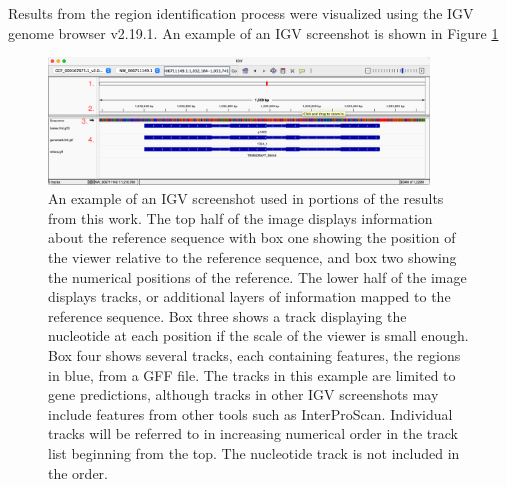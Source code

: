 Results from the region identification process were visualized using
the IGV genome browser v2.19.1\cite{Robinson2011}. An example of an
IGV screenshot is shown in Figure \ref{fig:igv-methods}

\begin{figure}
  \centering
  \includegraphics[width=0.9\textwidth]{figures/igv/igv-agreement-thin-number}
  \caption[IGV example]{An example of an IGV screenshot used in
    portions of the results from this work. The top half of the image
    displays information about the reference sequence with box one
    showing the position of the viewer relative to the reference
    sequence, and box two showing the numerical positions of the
    reference. The lower half of the image displays tracks, or
    additional layers of information mapped to the reference
    sequence. Box three shows a track displaying the nucleotide at
    each position if the scale of the viewer is small enough. Box four
    shows several tracks, each containing features, the regions in
    blue, from a GFF file. The tracks in this example are limited to
    gene predictions, although tracks in other IGV screenshots may
    include features from other tools such as InterProScan. Individual
    tracks will be referred to in increasing numerical order in the
    track list beginning from the top. The nucleotide track is not
    included in the order.}
  \label{fig:igv-methods}
\end{figure}

